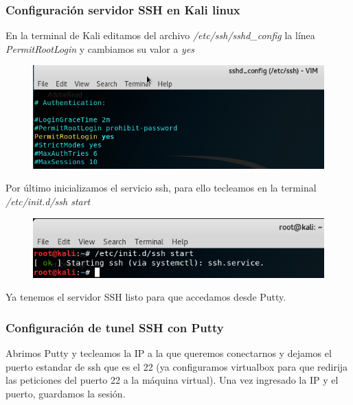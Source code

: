 \documentclass{article}
\begin{document}
\subsubsection{Configuraci\'on servidor SSH en Kali linux}

En la terminal de Kali editamos del archivo \emph{/etc/ssh/sshd\_config} la l\'inea \emph{PermitRootLogin} y cambiamos su valor a \emph{yes}

\begin{figure}[H]
\centering
\includegraphics[width=1\textwidth]{06-CONFIGURACIONSSHD}
\end{figure}

Por \'ultimo inicializamos el servicio ssh, para ello tecleamos en la terminal \emph{/etc/init.d/ssh start}

\begin{figure}[H]
\centering
\includegraphics[width=1\textwidth]{07-STARTSSHD}
\end{figure}

Ya tenemos el servidor SSH listo para que accedamos desde Putty.

\subsubsection{Configuraci\'on de tunel SSH con Putty}

Abrimos Putty y tecleamos la IP a la que queremos conectarnos y dejamos el puerto estandar de ssh que es el 22 (ya configuramos virtualbox para que redirija las peticiones del puerto 22 a la m\'aquina virtual). Una vez ingresado la IP y el puerto, guardamos la sesi\'on.
\end{document}
